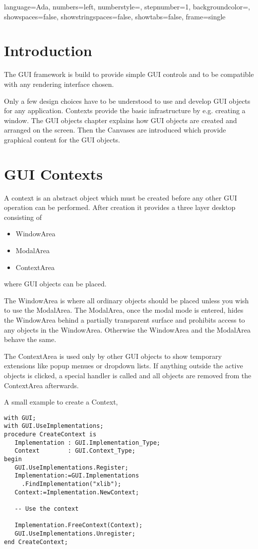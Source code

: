 \documentclass{article}
\begin{document}
\lstset
{
language=Ada,
numbers=left,
numberstyle=\tiny\color{gray},
stepnumber=1,
backgroundcolor=\color{white},
showspaces=false,
showstringspaces=false,
showtabs=false,
frame=single
}
\section{Introduction}
The GUI framework is build to provide simple GUI controls and to be compatible with any rendering interface chosen.

Only a few design choices have to be understood to use and develop GUI objects for any application.
Contexts provide the basic infrastructure by e.g. creating a window.
The GUI objects chapter explains how GUI objects are created and arranged on the screen.
Then the Canvases are introduced which provide graphical content for the GUI objects.

\section{GUI Contexts}
A context is an abstract object which must be created before any other GUI operation can be performed.
After creation it provides a three layer desktop consisting of
\begin{itemize}
 \item WindowArea
 \item ModalArea
 \item ContextArea
\end{itemize}
where GUI objects can be placed.

The WindowArea is where all ordinary objects should be placed unless you wish to use the ModalArea.
The ModalArea, once the modal mode is entered, hides the WindowArea behind a partially transparent
surface and prohibits access to any objects in the WindowArea.
Otherwise the WindowArea and the ModalArea behave the same.

The ContextArea is used only by other GUI objects to show temporary extensions like popup menues
or dropdown lists. If anything outside the active objects is clicked, a special handler is
called and all objects are removed from the ContextArea afterwards.

A small example to create a Context,
\begin{lstlisting}
with GUI;
with GUI.UseImplementations;
procedure CreateContext is
   Implementation : GUI.Implementation_Type;
   Context        : GUI.Context_Type;
begin
   GUI.UseImplementations.Register;
   Implementation:=GUI.Implementations
     .FindImplementation("xlib");
   Context:=Implementation.NewContext;

   -- Use the context

   Implementation.FreeContext(Context);
   GUI.UseImplementations.Unregister;
end CreateContext;
\end{lstlisting}
\end{document}
